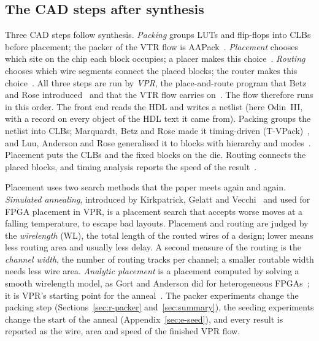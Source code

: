 \subsection{The CAD steps after synthesis}

Three CAD steps follow synthesis. \emph{Packing} groups LUTs and flip-flops into CLBs before placement; the packer of the VTR flow is AAPack~\cite{jamiesonthesis,luu2014thesis}. %
\emph{Placement} chooses which site on the chip each block occupies; a placer makes this choice~\cite{jamiesonthesis}. %
\emph{Routing} chooses which wire segments connect the placed blocks; the router makes this choice~\cite{jamiesonthesis}. %
All three steps are run by \emph{VPR}, the place-and-route program that Betz and Rose introduced~\cite{betz99purple_book} and that the VTR flow carries on~\cite{rose2012vtr,luu2014vtr7,murray2020vtr8}. %
The flow therefore runs in this order. The front end reads the HDL and writes a netlist (here Odin~III, with a record on every object of the HDL text it came from). Packing groups the netlist into CLBs; Marquardt, Betz and Rose made it timing-driven (T-VPack)~\cite{marquardt99cluster}, and Luu, Anderson and Rose generalised it to blocks with hierarchy and modes~\cite{luu2011packing}. Placement puts the CLBs and the fixed blocks on the die. Routing connects the placed blocks, and timing analysis reports the speed of the result~\cite{rose2012vtr,luu2014vtr7,murray2020vtr8}.

Placement uses two search methods that the paper meets again and again. \emph{Simulated annealing}, introduced by Kirkpatrick, Gelatt and Vecchi~\cite{kirkpatrick83annealing} and used for FPGA placement in VPR, is a placement search that accepts worse moves at a falling temperature, to escape bad layouts. %
Placement and routing are judged by the \emph{wirelength} (WL), the total length of the routed wires of a design; lower means less routing area and usually less delay. %
A second measure of the routing is the \emph{channel width}, the number of routing tracks per channel; a smaller routable width needs less wire area. %
\emph{Analytic placement} is a placement computed by solving a smooth wirelength model, as Gort and Anderson did for heterogeneous FPGAs~\cite{gort2012heap}; it is VPR's starting point for the anneal~\cite{murray2020vtr8}. %
The packer experiments change the packing step (Sections~\ref{sec:r-packer} and~\ref{sec:summary}), the seeding experiments change the start of the anneal (Appendix~\ref{sec:e-seed}), and every result is reported as the wire, area and speed of the finished VPR flow.

